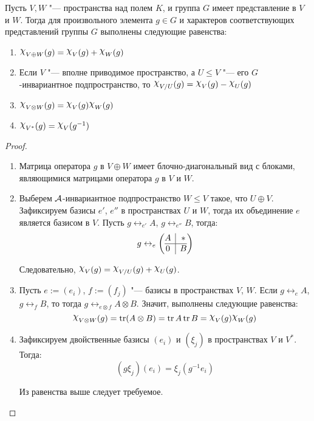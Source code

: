 \begin{proposition}
	Пусть $V, W$ "--- пространства над полем $K$, и группа $G$ имеет представление в $V$ и $W$. Тогда для произвольного элемента $g \in G$ и характеров соответствующих представлений группы $G$ выполнены следующие равенства:
	\begin{enumerate}
		\item $\Chi_{V \oplus W}(g) = \Chi_V(g) + \Chi_W(g)$
		
		\item Если $V$ "--- вполне приводимое пространство, а $U \le V$ "--- его $G$-инвариантное подпространство, то $\Chi_{V / U}(g) = \Chi_V(g) - \Chi_U(g)$
		
		\item $\Chi_{V \otimes W}(g) = \Chi_V(g)\Chi_W(g)$
		
		\item $\Chi_{V^*}(g) = \Chi_V(g^{-1})$
		
	\end{enumerate}
	
	\begin{proof}~
		\begin{enumerate}
			\item Матрица оператора $g$ в $V \oplus W$ имеет блочно-диагональный вид с блоками, являющимися матрицами оператора $g$ в $V$ и $W$.
			
			\item Выберем $\mathcal A$-инвариантное подпространство $W \le V$ такое, что $U \oplus V$. Зафиксируем базисы $e'$, $e''$ в пространствах $U$ и $W$, тогда их объединение $e$ является базисом в $V$. Пусть $g \leftrightarrow_{e'} A$, $g \leftrightarrow_{e''} B$, тогда:
			\[g \leftrightarrow_e \left(\begin{array}{@{}c|c@{}}
					A & *\\
					\hline
					0 & B
				\end{array}\right)\]
			
			Следовательно, $\Chi_V(g) = \Chi_{V / U}(g) + \Chi_U(g)$.
			
			\item Пусть $e := (e_i)$, $f := (f_j)$ "--- базисы в пространствах $V$, $W$. Если $g \leftrightarrow_{e} A$, $g \leftrightarrow_{f} B$, то тогда $g \leftrightarrow_{e \otimes f} A \otimes B$. Значит, выполнены следующие равенства:
			\[\Chi_{V \otimes W}(g) = \tr(A \otimes B) = \tr{A}\tr{B}=\Chi_V(g)\Chi_W(g)\]
			
			\item Зафиксируем двойственные базисы $(e_i)$ и $(\xi_j)$ в пространствах $V$ и $V^*$. Тогда:
			\[(g\xi_j)(e_i) = \xi_j(g^{-1} e_i)\]
			
			Из равенства выше следует требуемое.\qedhere
		\end{enumerate}
	\end{proof}
\end{proposition}

